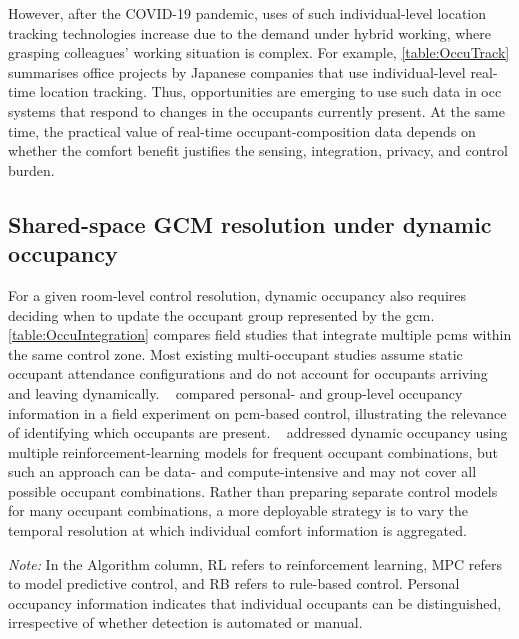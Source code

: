 However, after the COVID-19 pandemic, uses of such individual-level location tracking technologies increase due to the demand under hybrid working, where grasping colleagues' working situation is complex.
For example, \autoref{table:OccuTrack} summarises office projects by Japanese companies that use individual-level real-time location tracking. 
Thus, opportunities are emerging to use such data in \ac{occ} systems that respond to changes in the occupants currently present.
At the same time, the practical value of real-time occupant-composition data depends on whether the comfort benefit justifies the sensing, integration, privacy, and control burden.

\subsection{Shared-space GCM resolution under dynamic occupancy}
For a given room-level control resolution, dynamic occupancy also requires deciding when to update the occupant group represented by the \ac{gcm}.
\autoref{table:OccuIntegration} compares field studies that integrate multiple \acp{pcm} within the same control zone.
Most existing multi-occupant studies assume static occupant attendance configurations and do not account for occupants arriving and leaving dynamically.
~\cite{ono_impact_2022} compared personal- and group-level occupancy information in a field experiment on \ac{pcm}-based control, illustrating the relevance of identifying which occupants are present.
~\cite{lei_practical_2022} addressed dynamic occupancy using multiple reinforcement-learning models for frequent occupant combinations, but such an approach can be data- and compute-intensive and may not cover all possible occupant combinations.
Rather than preparing separate control models for many occupant combinations, a more deployable strategy is to vary the temporal resolution at which individual comfort information is aggregated.

\begin{table}[pos=!htbp]
  \centering
  \small
  \begin{threeparttable}
    \caption{Studies integrating multiple \acp{pcm} into \ac{occ} across control and occupancy-information resolutions.}
    \label{table:OccuIntegration}
    
    \begin{tablenotes}[flushleft]
      \footnotesize
      \item[] \textit{Note:} In the Algorithm column, RL refers to reinforcement learning, MPC refers to model predictive control, and RB refers to rule-based control.
      Personal occupancy information indicates that individual occupants can be distinguished, irrespective of whether detection is automated or manual.
    \end{tablenotes}
  \end{threeparttable}
\end{table}

